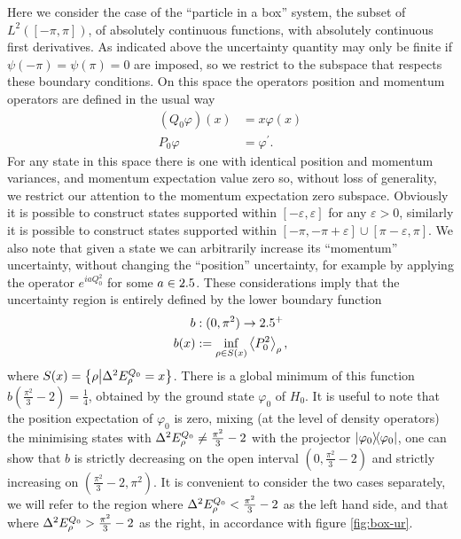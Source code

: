 Here we consider the case of the ``particle in a box'' system, the subset of $L^2([-\pi,\pi])$, of absolutely continuous functions, with absolutely continuous first derivatives. As indicated above the uncertainty quantity may only be finite if  $\psi(-\pi) = \psi(\pi) = 0$ are imposed, so we restrict to the subspace that respects these boundary conditions. On this space the operators position and momentum operators are defined in the usual way
\begin{align}
  (Q_0 \varphi)(x) &= x \varphi(x)\\
  P_0\varphi &= \varphi^\prime.
\end{align}
For any state in this space there is one with identical position and momentum variances, and momentum expectation value zero so, without loss of generality, we restrict our attention to the momentum expectation zero subspace. Obviously it is possible to construct states supported within $[-\varepsilon, \varepsilon]$ for any $\varepsilon>0$, similarly it is possible to construct states supported within $[-\pi, -\pi+\varepsilon]\cup [\pi-\varepsilon, \pi]$. We also note that given a state we can arbitrarily increase its ``momentum'' uncertainty, without changing the ``position'' uncertainty, for example by applying the operator $e^{i a Q_0^2}$ for some $a\in2.5$. These considerations imply that the uncertainty region is entirely defined by the lower boundary function
\begin{align}
  b&:(0,\pi^2)\to 2.5^+\\
  b(x) &:= \inf_{\rho\in S(x)} \left\langle P_0^2\right\rangle_\rho,
\end{align}
where $S(x) = \left\{\rho\middle|\var{E^{Q_0}_\rho} = x \right\}$. There is a global minimum of this function $b\left(\frac{\pi^2}{3} -2\right) = \frac{1}{4}$, obtained by the ground state $\varphi_0$ of $H_0$. It is useful to note that the position expectation of $\varphi_0$ is zero, mixing (at the level of density operators) the minimising states with $\var{E^{Q_0}_\rho}\neq\frac{\pi^2}{3} -2$ with the projector $|\varphi_0\rangle\!\langle\varphi_0|$, one can show that $b$ is strictly decreasing on the open interval $\left(0,\frac{\pi^2}{3} -2\right)$ and strictly increasing on $\left(\frac{\pi^2}{3} -2,\pi^2\right)$. It is convenient to consider the two cases separately, we will refer to the region where $\var{E^{Q_0}_\rho} < \frac{\pi^2}{3} -2$ as the left hand side, and that where $\var{E^{Q_0}_\rho} > \frac{\pi^2}{3} -2$ as the right, in accordance with figure \ref{fig:box-ur}.

